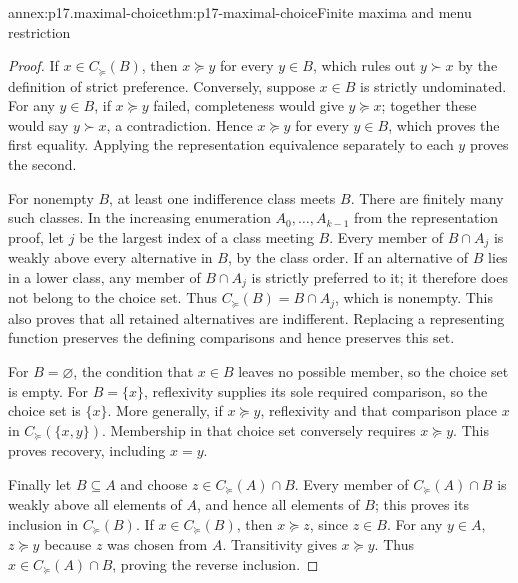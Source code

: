 \begin{annexitem}{annex:p17.maximal-choice}{thm:p17-maximal-choice}{Finite maxima and menu restriction}
\begin{proof}
If \(x\in C_{\succeq}(B)\), then \(x\succeq y\) for every
\(y\in B\), which rules out \(y\succ x\) by the definition of
strict preference. Conversely, suppose \(x\in B\) is strictly
undominated. For any \(y\in B\), if \(x\succeq y\) failed,
completeness would give \(y\succeq x\); together these would say
\(y\succ x\), a contradiction. Hence \(x\succeq y\) for every
\(y\in B\), which proves the first equality. Applying the
representation equivalence separately to each \(y\) proves the second.

For nonempty \(B\), at least one indifference class meets \(B\).
There are finitely many such classes. In the increasing enumeration
\(A_0,\ldots,A_{k-1}\) from the representation proof, let \(j\)
be the largest index of a class meeting \(B\). Every member of
\(B\cap A_j\) is weakly above every alternative in \(B\), by the
class order. If an alternative of \(B\) lies in a lower class, any
member of \(B\cap A_j\) is strictly preferred to it; it therefore
does not belong to the choice set. Thus
\(C_{\succeq}(B)=B\cap A_j\), which is nonempty. This also proves
that all retained alternatives are indifferent. Replacing a representing
function preserves the defining comparisons and hence preserves this set.

For \(B=\varnothing\), the condition that \(x\in B\) leaves no
possible member, so the choice set is empty. For \(B=\{x\}\),
reflexivity supplies its sole required comparison, so the choice set is
\(\{x\}\). More generally, if \(x\succeq y\), reflexivity and
that comparison place \(x\) in \(C_{\succeq}(\{x,y\})\).
Membership in that choice set conversely requires \(x\succeq y\).
This proves recovery, including \(x=y\).

Finally let \(B\subseteq A\) and choose
\(z\in C_{\succeq}(A)\cap B\). Every member of
\(C_{\succeq}(A)\cap B\) is weakly above all elements of \(A\),
and hence all elements of \(B\); this proves its inclusion in
\(C_{\succeq}(B)\). If \(x\in C_{\succeq}(B)\), then
\(x\succeq z\), since \(z\in B\). For any \(y\in A\),
\(z\succeq y\) because \(z\) was chosen from \(A\).
Transitivity gives \(x\succeq y\). Thus
\(x\in C_{\succeq}(A)\cap B\), proving the reverse inclusion.
\end{proof}
\end{annexitem}

